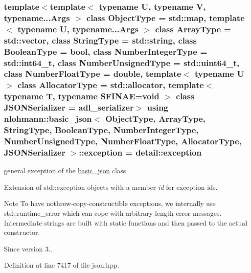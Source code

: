 \subsubsection[{\texorpdfstring{exception}{exception}}]{\setlength{\rightskip}{0pt plus 5cm}template$<$template$<$ typename U, typename V, typename...\+Args $>$ class Object\+Type = std\+::map, template$<$ typename U, typename...\+Args $>$ class Array\+Type = std\+::vector, class String\+Type  = std\+::string, class Boolean\+Type  = bool, class Number\+Integer\+Type  = std\+::int64\+\_\+t, class Number\+Unsigned\+Type  = std\+::uint64\+\_\+t, class Number\+Float\+Type  = double, template$<$ typename U $>$ class Allocator\+Type = std\+::allocator, template$<$ typename T, typename S\+F\+I\+N\+A\+E=void $>$ class J\+S\+O\+N\+Serializer = adl\+\_\+serializer$>$ using {\bf nlohmann\+::basic\+\_\+json}$<$ Object\+Type, Array\+Type, String\+Type, Boolean\+Type, Number\+Integer\+Type, Number\+Unsigned\+Type, Number\+Float\+Type, Allocator\+Type, J\+S\+O\+N\+Serializer $>$\+::{\bf exception} =  {\bf detail\+::exception}}\hypertarget{classnlohmann_1_1basic__json_a9a0aced019cb1d65bb49703406c84970}{}\label{classnlohmann_1_1basic__json_a9a0aced019cb1d65bb49703406c84970}


general exception of the \hyperlink{classnlohmann_1_1basic__json}{basic\+\_\+json} class 

Extension of std\+::exception objects with a member {\itshape id} for exception ids.

\begin{DoxyNote}{Note}
To have nothrow-\/copy-\/constructible exceptions, we internally use std\+::runtime\+\_\+error which can cope with arbitrary-\/length error messages. Intermediate strings are built with static functions and then passed to the actual constructor.
\end{DoxyNote}
\begin{DoxySince}{Since}
version 3.. 
\end{DoxySince}


Definition at line 7417 of file json.\+hpp.

